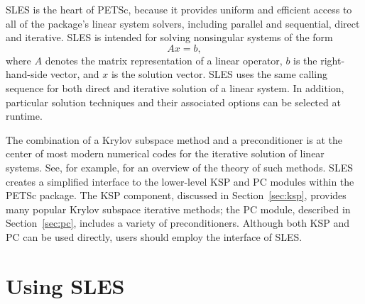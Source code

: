 SLES is the heart of PETSc, because it provides uniform and efficient access 
to all of the package's linear system solvers, including parallel and sequential,
direct and iterative.
SLES is intended for solving nonsingular systems of the form
\begin{equation}
   A x = b,
\label{eq:Ax=b}
\end{equation}
where $ A$ denotes the matrix representation of a linear operator, $b$
is the right-hand-side vector, and $ x $ is the solution vector.  SLES
uses the same calling sequence for both direct and iterative solution
of a linear system.  In addition, particular solution techniques and
their associated options can be selected at runtime.

The combination of a Krylov subspace method and a preconditioner is at
the center of most modern numerical codes for the iterative solution of
linear systems.  See, for example, \cite{fgn} for an overview of the theory
of such methods.  SLES creates a simplified interface to the
lower-level KSP and PC modules within the PETSc package.  The KSP component, 
discussed in
Section~\ref{sec:ksp}, provides many popular Krylov
 subspace iterative methods;
the PC module, described in Section~\ref{sec:pc}, includes a
variety of preconditioners.  Although both  KSP and PC can be used
directly, users should employ the interface of SLES.

\section{Using SLES} 
\label{sec:usingsles}

